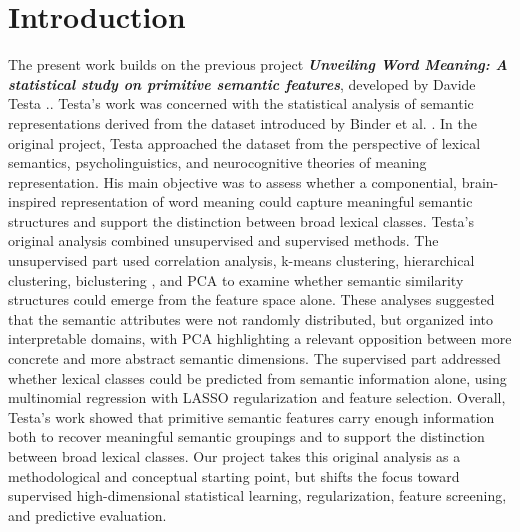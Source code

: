 \documentclass{ipgpmaster}
\begin{document}
\newpage
\tableofcontents
\newpage

\section{Introduction}

The present work builds on the previous project \emph{\textbf{\textit{Unveiling Word Meaning: A statistical study on primitive semantic features}}}, developed by Davide Testa \cite{testaLinkedin}.. Testa's work was concerned with the statistical analysis of semantic representations derived from the dataset introduced by Binder et al. \cite{binder2016toward}. In the original project, Testa approached the dataset from the perspective of lexical semantics, psycholinguistics, and neurocognitive theories of meaning representation. His main objective was to assess whether a componential, brain-inspired representation of word meaning could capture meaningful semantic structures and support the distinction between broad lexical classes. Testa's original analysis combined unsupervised and supervised methods. The unsupervised part used correlation analysis, k-means clustering, hierarchical clustering, biclustering \cite{csardi2023isa2}, and PCA to examine whether semantic similarity structures could emerge from the feature space alone. These analyses suggested that the semantic attributes were not randomly distributed, but organized into interpretable domains, with PCA highlighting a relevant opposition between more concrete and more abstract semantic dimensions. The supervised part addressed whether lexical classes could be predicted from semantic information alone, using multinomial regression with LASSO regularization and feature selection. Overall, Testa's work showed that primitive semantic features carry enough information both to recover meaningful semantic groupings and to support the distinction between broad lexical classes. Our project takes this original analysis as a methodological and conceptual starting point, but shifts the focus toward supervised high-dimensional statistical learning, regularization, feature screening, and predictive evaluation.
\end{document}
